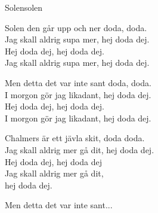 \newpage

\begin{song}{Solen}{solen}
\begin{vers}
Solen den går upp och ner doda, doda.\\
Jag skall aldrig supa mer, hej doda dej.\\
Hej doda dej, hej doda dej.\\
Jag skall aldrig supa mer, hej doda dej.\\
\end{vers}
\begin{vers}
Men detta det var inte sant doda, doda.\\
I morgon gör jag likadant, hej doda dej.\\
Hej doda dej, hej doda dej.\\
I morgon gör jag likadant, hej doda dej.\\
\end{vers}
\begin{vers}
Chalmers är ett jävla skit, doda doda.\\
Jag skall aldrig mer gå dit, hej doda dej.\\
Hej doda dej, hej doda dej\\
Jag skall aldrig mer gå dit,\\
hej doda dej.\\
\end{vers}
\begin{vers}
Men detta det var inte sant...\\
\end{vers}
\end{song}


\newpage

